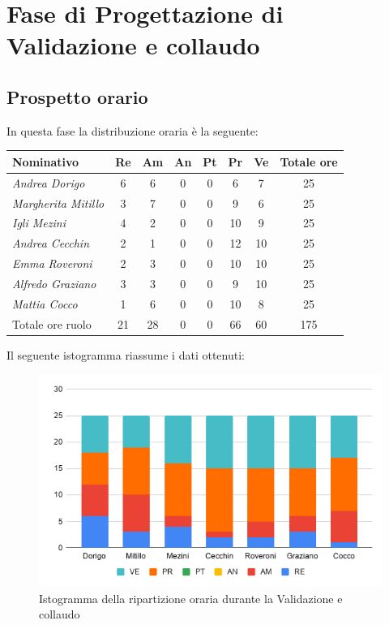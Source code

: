 {{{{{{{{\section{Fase di Progettazione di Validazione e collaudo}\label{PreventivoFaseDiProgettazionediValidazioneECollaudo}

\subsection{Prospetto orario}\label{PreventivoPreventivoFaseDiProgettazionediValidazioneECollaudoProspettoOrario}
In questa fase la distribuzione oraria è la seguente:
\quad
\def\tabularxcolumn#1{m{#1}}
{

	\begin{center}
		\renewcommand{\arraystretch}{1.4}
		\begin{tabularx}{\textwidth}{|X|c|c|c|c|c|c|c|}
			\hline
			\rowcolor{airforceblue}
			\textbf{Nominativo} & \textbf{Re} & \textbf{Am} & \textbf{An} & \textbf{Pt} & \textbf{Pr} & \textbf{Ve} & \textbf{Totale ore}\\
			\hline
			\textit{Andrea Dorigo} & 6 & 6 & 0 & 0 & 6 & 7 & 25\\
			\hline
			\textit{Margherita Mitillo} & 3 & 7 & 0 & 0 & 9 & 6 & 25\\
			\hline
			\textit{Igli Mezini} & 4 & 2 & 0 & 0 & 10 & 9 & 25\\
			\hline
			\textit{Andrea Cecchin} & 2 & 1 & 0 & 0 & 12 & 10 & 25\\
			\hline
			\textit{Emma Roveroni} & 2 & 3 & 0 & 0 & 10 & 10 & 25\\
			\hline
			\textit{Alfredo Graziano} & 3 & 3 & 0 & 0 & 9 & 10 & 25\\
			\hline
			\textit{Mattia Cocco} & 1 & 6 & 0 & 0 & 10 & 8 & 25\\
			\hline
			Totale ore ruolo & 21 & 28 & 0 & 0 & 66 & 60 & 175\\
			\hline
		\end{tabularx}
	\end{center}
Il seguente istogramma riassume i dati ottenuti:
\begin{figure}[!ht]
	\begin{center}
		\includegraphics[width=0.7\linewidth]{../immagini/pdp/istogramma_validazione.png}
		\caption{Istogramma della ripartizione oraria durante la Validazione e
			collaudo}
	\end{center}
\end{figure}
\clearpage
}}}}}}}}}
